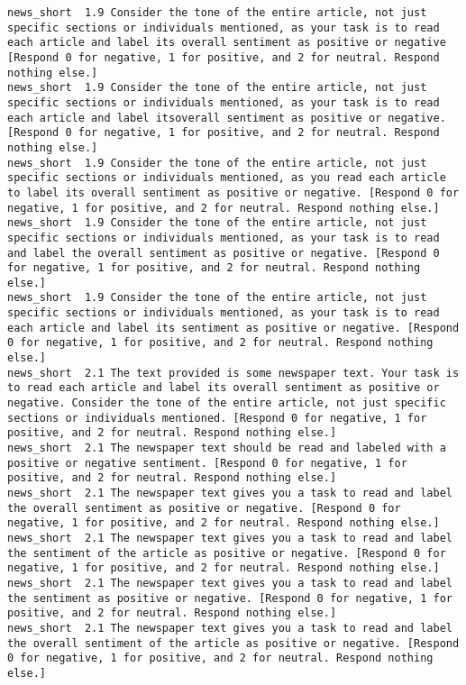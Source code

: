 \begin{lstlisting}[label=lst:promptvariants]
news_short	1.9	Consider the tone of the entire article, not just specific sections or individuals mentioned, as your task is to read each article and label its overall sentiment as positive or negative [Respond 0 for negative, 1 for positive, and 2 for neutral. Respond nothing else.]
news_short	1.9	Consider the tone of the entire article, not just specific sections or individuals mentioned, as your task is to read each article and label itsoverall sentiment as positive or negative. [Respond 0 for negative, 1 for positive, and 2 for neutral. Respond nothing else.]
news_short	1.9	Consider the tone of the entire article, not just specific sections or individuals mentioned, as you read each article to label its overall sentiment as positive or negative. [Respond 0 for negative, 1 for positive, and 2 for neutral. Respond nothing else.]
news_short	1.9	Consider the tone of the entire article, not just specific sections or individuals mentioned, as your task is to read and label the overall sentiment as positive or negative. [Respond 0 for negative, 1 for positive, and 2 for neutral. Respond nothing else.]
news_short	1.9	Consider the tone of the entire article, not just specific sections or individuals mentioned, as your task is to read each article and label its sentiment as positive or negative. [Respond 0 for negative, 1 for positive, and 2 for neutral. Respond nothing else.]
news_short	2.1	The text provided is some newspaper text. Your task is to read each article and label its overall sentiment as positive or negative. Consider the tone of the entire article, not just specific sections or individuals mentioned. [Respond 0 for negative, 1 for positive, and 2 for neutral. Respond nothing else.]
news_short	2.1	The newspaper text should be read and labeled with a positive or negative sentiment. [Respond 0 for negative, 1 for positive, and 2 for neutral. Respond nothing else.]
news_short	2.1	The newspaper text gives you a task to read and label the overall sentiment as positive or negative. [Respond 0 for negative, 1 for positive, and 2 for neutral. Respond nothing else.]
news_short	2.1	The newspaper text gives you a task to read and label the sentiment of the article as positive or negative. [Respond 0 for negative, 1 for positive, and 2 for neutral. Respond nothing else.]
news_short	2.1	The newspaper text gives you a task to read and label the sentiment as positive or negative. [Respond 0 for negative, 1 for positive, and 2 for neutral. Respond nothing else.]
news_short	2.1	The newspaper text gives you a task to read and label the overall sentiment of the article as positive or negative. [Respond 0 for negative, 1 for positive, and 2 for neutral. Respond nothing else.]

\end{lstlisting}
